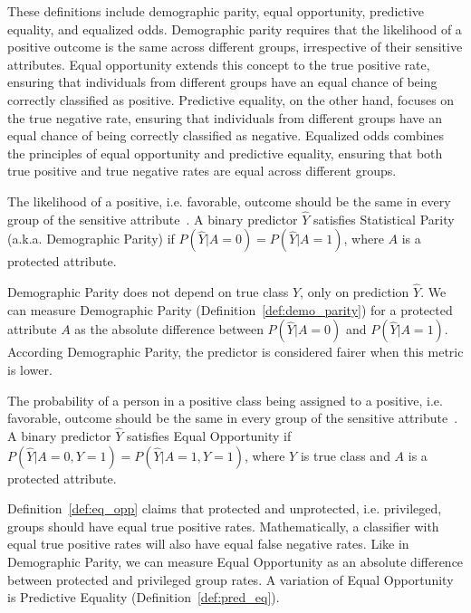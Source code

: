 These definitions include demographic parity, equal opportunity, predictive equality, and equalized odds. Demographic parity requires that the likelihood of a positive outcome is the same across different groups, irrespective of their sensitive attributes. Equal opportunity extends this concept to the true positive rate, ensuring that individuals from different groups have an equal chance of being correctly classified as positive. Predictive equality, on the other hand, focuses on the true negative rate, ensuring that individuals from different groups have an equal chance of being correctly classified as negative. Equalized odds combines the principles of equal opportunity and predictive equality, ensuring that both true positive and true negative rates are equal across different groups.



\begin{definition}\label{def:demo_parity}
The likelihood of a positive, i.e. favorable, outcome should be the same in every group of the sensitive attribute~\citep{Dwork2011,Kusner2018}. A binary predictor $\hat{Y}$ satisfies Statistical Parity (a.k.a. Demographic Parity) if $P(\hat{Y}|A=0) = P(\hat{Y}|A=1)$, where $A$ is a protected attribute.
\end{definition}

Demographic Parity does not depend on true class $Y$, only on prediction $\hat{Y}$. We can measure Demographic Parity (Definition~\ref{def:demo_parity}) for a protected attribute $A$ as the absolute difference between $P(\hat{Y}|A=0)$ and $P(\hat{Y}|A=1)$. According Demographic Parity, the predictor is considered fairer when this metric is lower. 

\begin{definition}\label{def:eq_opp}
The probability of a person in a positive class being assigned to a positive, i.e. favorable, outcome should be the same in every group of the sensitive attribute~\citep{Hardt2016}. A binary predictor $\hat{Y}$ satisfies Equal Opportunity if $P(\hat{Y}|A=0,Y=1) = P(\hat{Y}|A=1,Y=1)$, where $Y$ is true class and $A$ is a protected attribute.
\end{definition}

Definition~\ref{def:eq_opp} claims that protected and unprotected, i.e. privileged, groups should have equal true positive rates. Mathematically, a classifier with equal true positive rates will also have equal false negative rates. Like in Demographic Parity, we can measure Equal Opportunity as an absolute difference between protected and privileged group rates. A variation of Equal Opportunity is Predictive Equality (Definition~\ref{def:pred_eq}).


